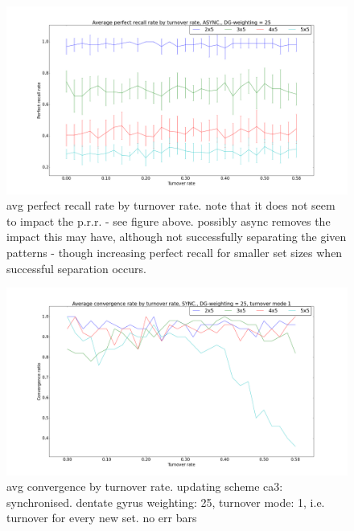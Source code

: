 \begin{figure}[h!]
    \centering
    \includegraphics[width=14cm]{fig/avg_perfect_recall_rate_by_turnover_rate_async_dgw_25.png}
    \caption{avg perfect recall rate by turnover rate. note that it does not seem to impact the p.r.r. - see figure above. possibly async removes the impact this may have, although not successfully separating the given patterns - though increasing perfect recall for smaller set sizes when successful separation occurs.}
    \label{fig:avg_perfect_recall_rate_by_turnover_rate_async_dgw_25}
\end{figure}

\begin{figure}
    \centering
    \includegraphics[width=14cm]{fig/avg_convergence_by_turnover_rate_sync_dgw_25_t_m_1_no_err_bars}
    \caption{avg convergence by turnover rate. updating scheme ca3: synchronised. dentate gyrus weighting: 25, turnover mode: 1, i.e. turnover for every new set. no err bars}
    \label{fig:avg_convergence_by_turnover_rate_sync_dgw_25_t_m_1_no_err_bars}
\end{figure}

